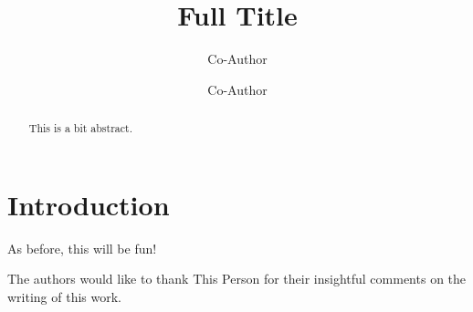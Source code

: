 \documentclass[sigplan, review, anonymous=false]{acmart}
\begin{document}

\title[Short Title]{Full Title}

\author{Co-Author}

\author{Co-Author}

\begin{abstract}

  This is a bit abstract.

\end{abstract}

\maketitle

\section{Introduction}

As before\cite{item2000}, this will be fun!

\begin{acks}
  The authors would like to thank This Person for their insightful
  comments on the writing of this work.
\end{acks}



\end{document}
